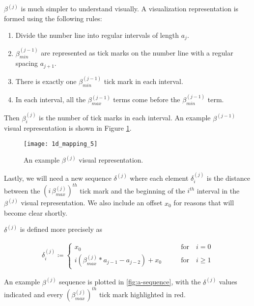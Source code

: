 $\beta^{(j)}$ is much simpler to understand visually. A visualization representation is formed using the following rules:

\begin{enumerate}
  \item Divide the number line into regular intervals of length $a_{j}$.
  \item $\beta^{(j-1)}_{min}$ are represented as tick marks on the number line with a regular spacing $a_{j+1}$.
	\item There is exactly one $\beta^{(j-1)}_{min}$ tick mark in each interval.
	\item In each interval, all the $\beta^{(j-1)}_{max}$ terms come before the $\beta^{(j-1)}_{min}$ term.
\end{enumerate}

Then $\beta^{(j)}_i$ is the number of tick marks in each interval. An example $\beta^{(j-1)}$ visual representation is shown in Figure \ref{fig:beta-sequence-j}.

\begin{figure}[H]
  \begin{center}
    \texttt{[image: 1d\_mapping\_5]}
  \end{center}
  \vspace{-.2in} %
  \caption{\label{fig:beta-sequence-j} An example $\beta^{(j)}$ visual representation.}
\end{figure}

Lastly, we will need a new sequence $\delta^{(j)}$ where each element $\delta^{(j)}_i$ is the distance between the $(i \, \beta^{(j)}_{max})^{th}$ tick mark and the beginning of the $i^{th}$ interval in the $\beta^{(j)}$ visual representation. We also include an offset $x_0$ for reasons that will become clear shortly.

\begin{definition}
  $\delta^{(j)}$ is defined more precisely as

  \begin{align}\label{delta_beta}
    \delta^{(j)}_i \coloneqq \begin{cases}
      x_0 \qquad &\text{for} \quad i = 0\\
      i (\beta^{(j)}_{max} * a_{j-1} - a_{j-2}) + x_0 \qquad &\text{for} \quad i \ge 1
    \end{cases}
  \end{align}
\end{definition}

An example $\beta^{(j)}$ sequence is plotted in \ref{fig:a-sequence}, with the $\delta^{(j)}$ values indicated and every $(\beta^{(j)}_{max})^{th}$ tick mark highlighted in red.

